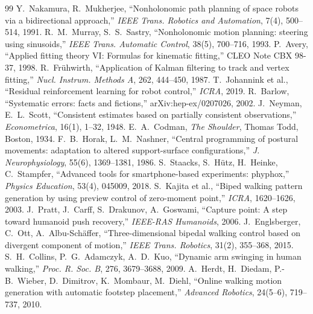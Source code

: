 \documentclass[paper=a4paper,fontsize=10pt,twocolumn,column_gap=2zw,line_length=24zw,number_of_lines=46,head_space=20mm]{jlreq}
\begin{document}
\begin{thebibliography}{99}
 Y.~Nakamura, R.~Mukherjee, ``Nonholonomic path planning of space robots via a bidirectional approach,'' \textit{IEEE Trans. Robotics and Automation}, 7(4), 500--514, 1991.
 R.~M.~Murray, S.~S.~Sastry, ``Nonholonomic motion planning: steering using sinusoids,'' \textit{IEEE Trans. Automatic Control}, 38(5), 700--716, 1993.
 P.~Avery, ``Applied fitting theory VI: Formulas for kinematic fitting,'' CLEO Note CBX 98-37, 1998.
 R.~Frühwirth, ``Application of Kalman filtering to track and vertex fitting,'' \textit{Nucl. Instrum. Methods A}, 262, 444--450, 1987.
 T.~Johannink et al., ``Residual reinforcement learning for robot control,'' \textit{ICRA}, 2019.
 R.~Barlow, ``Systematic errors: facts and fictions,'' arXiv:hep-ex/0207026, 2002.
 J.~Neyman, E.~L.~Scott, ``Consistent estimates based on partially consistent observations,'' \textit{Econometrica}, 16(1), 1--32, 1948.
 E.~A.~Codman, \textit{The Shoulder}, Thomas Todd, Boston, 1934.
 F.~B.~Horak, L.~M.~Nashner, ``Central programming of postural movements: adaptation to altered support-surface configurations,'' \textit{J. Neurophysiology}, 55(6), 1369--1381, 1986.
 S.~Staacks, S.~Hütz, H.~Heinke, C.~Stampfer, ``Advanced tools for smartphone-based experiments: phyphox,'' \textit{Physics Education}, 53(4), 045009, 2018.
 S.~Kajita et al., ``Biped walking pattern generation by using preview control of zero-moment point,'' \textit{ICRA}, 1620--1626, 2003.
 J.~Pratt, J.~Carff, S.~Drakunov, A.~Goswami, ``Capture point: A step toward humanoid push recovery,'' \textit{IEEE-RAS Humanoids}, 2006.
 J.~Englsberger, C.~Ott, A.~Albu-Sch\"affer, ``Three-dimensional bipedal walking control based on divergent component of motion,'' \textit{IEEE Trans. Robotics}, 31(2), 355--368, 2015.
 S.~H.~Collins, P.~G.~Adamczyk, A.~D.~Kuo, ``Dynamic arm swinging in human walking,'' \textit{Proc. R. Soc. B}, 276, 3679--3688, 2009.
 A.~Herdt, H.~Diedam, P.-B.~Wieber, D.~Dimitrov, K.~Mombaur, M.~Diehl, ``Online walking motion generation with automatic footstep placement,'' \textit{Advanced Robotics}, 24(5--6), 719--737, 2010.
\end{thebibliography}
\end{document}
